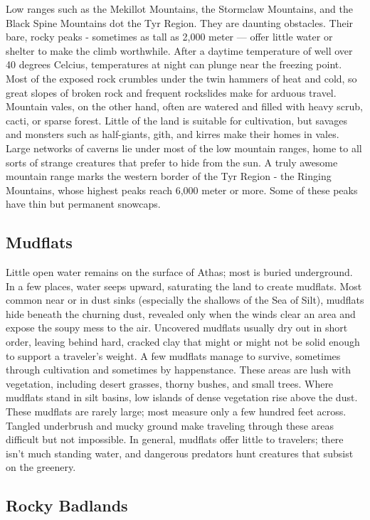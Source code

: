 \begin{multicols}{2}
Low ranges such as the Mekillot Mountains, the Stormclaw Mountains, and the
Black Spine Mountains dot the Tyr Region. They are daunting obstacles. Their
bare, rocky peaks - sometimes as tall as 2,000 meter — offer little water or
shelter to make the climb worthwhile. After a daytime temperature of well over
40 degrees Celcius, temperatures at night can plunge near the freezing point.
Most of the exposed rock crumbles under the twin hammers of heat and cold, so
great slopes of broken rock and frequent rockslides make for arduous travel.
Mountain vales, on the other hand, often are watered and filled with heavy
scrub, cacti, or sparse forest. Little of the land is suitable for
cultivation, but savages and monsters such as half-giants, gith, and kirres
make their homes in vales. Large networks of caverns lie under most of the low
mountain ranges, home to all sorts of strange creatures that prefer to hide
from the sun. A truly awesome mountain range marks the western border of the
Tyr Region - the Ringing Mountains, whose highest peaks reach 6,000 meter or
more. Some of these peaks have thin but permanent snowcaps.

\subsection{Mudflats}

Little open water remains on the surface of Athas; most is buried underground.
In a few places, water seeps upward, saturating the land to create mudflats.
Most common near or in dust sinks (especially the shallows of the Sea of Silt),
mudflats hide beneath the churning dust, revealed only when the winds clear an
area and expose the soupy mess to the air. Uncovered mudflats usually dry out
in short order, leaving behind hard, cracked clay that might or might not be
solid enough to support a traveler's weight. A few mudflats manage to survive,
sometimes through cultivation and sometimes by happenstance. These areas are
lush with vegetation, including desert grasses, thorny bushes, and small trees.
Where mudflats stand in silt basins, low islands of dense vegetation rise above
the dust. These mudflats are rarely large; most measure only a few hundred feet
across. Tangled underbrush and mucky ground make traveling through these areas
difficult but not impossible. In general, mudflats offer little to travelers;
there isn't much standing water, and dangerous predators hunt creatures that
subsist on the greenery.

\subsection{Rocky Badlands}


\end{multicols}
